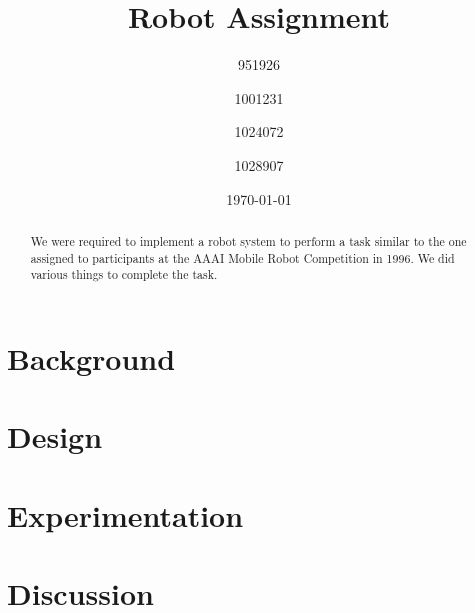 \documentclass[conference]{IEEEtran}
\title{Robot Assignment}
\author{951926 \and 1001231 \and 1024072 \and 1028907}
\date{\today}
\begin{document}
\maketitle

\begin{abstract}
  We were required to implement a robot system to perform a task similar to the one assigned to participants at the AAAI Mobile Robot Competition in 1996. We did various things to complete the task.
\end{abstract}
\section{Background}
\section{Design}
\section{Experimentation}
\section{Discussion}
\end{document}

